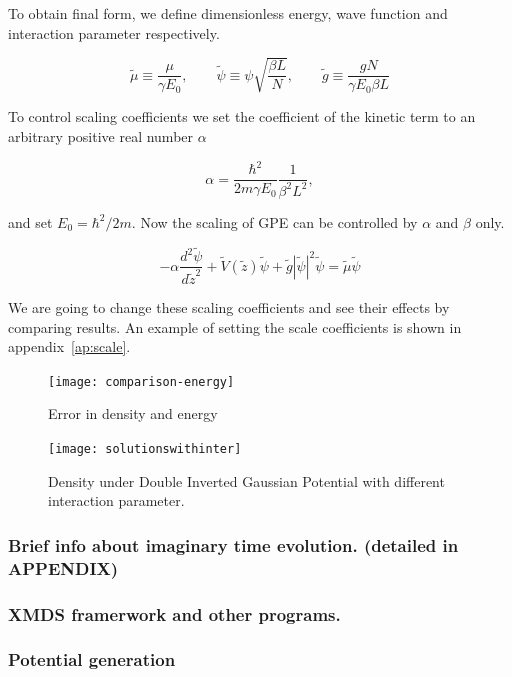 \documentclass[a4paper,times,hidelinks,12pt]{article}
\begin{document}
To obtain final form, we define dimensionless energy, wave function and interaction parameter respectively. 

$$\widetilde{\mu} \equiv \frac{\mu}{\gamma E_0}, \qquad \widetilde{\psi} \equiv \psi{\sqrt{\frac{\beta L}{N}}}, \qquad \widetilde{g} \equiv \frac{gN}{\gamma E_0 \beta L} $$

To control scaling coefficients we set the coefficient of the kinetic term to an arbitrary positive real number $\alpha$  

$$ \alpha = \frac{\hbar^2}{2m\gamma E_0} \frac{1}{\beta^2 L^2} , $$

and set $E_0 = \hbar^2 / 2m$. Now the scaling of GPE can be controlled by $\alpha$ and $\beta$ only.

\begin{equation}
\label{eq:GPE_dimensionless}
    -\alpha\frac{d^2\widetilde{\psi}}{d\widetilde{z}^2} + \widetilde{V}(\widetilde{z})\widetilde{\psi} + \widetilde{g}|\widetilde{\psi}|^2 \widetilde{\psi} = \widetilde{\mu} \widetilde{\psi}
\end{equation}
    
We are going to change these scaling coefficients and see their effects by comparing results. An example of setting the scale coefficients is shown in appendix~\ref{ap:scale}.



\graphicspath{{"../figs/numericanalyze/"}}
\begin{figure}[H]
\centering
    \texttt{[image: comparison-energy]}
\caption{Error in density and energy}
\label{fig:dens_energy_error}
\end{figure}


\graphicspath{{"../figs/potentials/"}}
\begin{figure}[H]
    \texttt{[image: solutionswithinter]}
    \caption{Density under Double Inverted Gaussian Potential with different interaction parameter.}
\label{fig:gaussian_pot_and_density}
\end{figure}

\subsubsection{Brief info about imaginary time evolution. (detailed in APPENDIX)}
\subsubsection{XMDS framerwork and other programs.}
\subsubsection{Potential generation}
\end{document}
